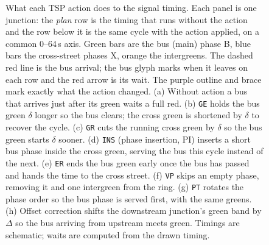 \documentclass[letterpaper,8pt]{extarticle}
\begin{document}
\begin{figure}[p]\centering

\caption{What each TSP action does to the signal timing. Each panel is one junction: the \emph{plan} row is the timing that runs without the action and the row below it is the same cycle with the action applied, on a common 0--64\,s axis. Green bars are the bus (main) phase \textsf{B}, blue bars the cross-street phases \textsf{X}, orange the intergreens. The dashed red line is the bus arrival; the bus glyph marks when it leaves on each row and the red arrow is its wait. The purple outline and brace mark exactly what the action changed. (a) Without action a bus that arrives just after its green waits a full red. (b) \texttt{GE} holds the bus green $\delta$ longer so the bus clears; the cross green is shortened by $\delta$ to recover the cycle. (c) \texttt{GR} cuts the running cross green by $\delta$ so the bus green starts $\delta$ sooner. (d) \texttt{INS} (phase insertion, PI) inserts a short bus phase inside the cross green, serving the bus this cycle instead of the next. (e) \texttt{ER} ends the bus green early once the bus has passed and hands the time to the cross street. (f) \texttt{VP} skips an empty phase, removing it and one intergreen from the ring. (g) \texttt{PT} rotates the phase order so the bus phase is served first, with the same greens. (h) Offset correction shifts the downstream junction's green band by $\Delta$ so the bus arriving from upstream meets green. Timings are schematic; waits are computed from the drawn timing.}
\end{figure}
\end{document}
